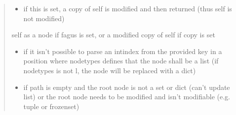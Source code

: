 \documentclass[a4paper,10pt,english]{sphinxmanual}
\begin{document}
\begin{fulllineitems}
\begin{fulllineitems}
\begin{quote}
\begin{description}
\begin{itemize}
\item {}
\sphinxAtStartPar
{} \textendash{} if this is set, a copy of self is modified and then returned (thus self is not modified)

\end{itemize}

\sphinxAtStartPar
self as a node if fagus is set, or a modified copy of self if copy is set

\begin{itemize}
\item {}
\sphinxAtStartPar
{} \textendash{} if it isn’t possible to parse an int\sphinxhyphen{}index from the provided key in a position where node\sphinxhyphen{}types
    defines that the node shall be a list (if node\sphinxhyphen{}types is not l, the node will be replaced with a dict)

\item {}
\sphinxAtStartPar
{} \textendash{} if path is empty and the root node is not a set or dict (can’t update list) or the root node
    needs to be modified and isn’t modifiable (e.g. tuple or frozenset)

\end{itemize}

\end{description}\end{quote}

\end{fulllineitems}



\end{fulllineitems}
\end{document}
